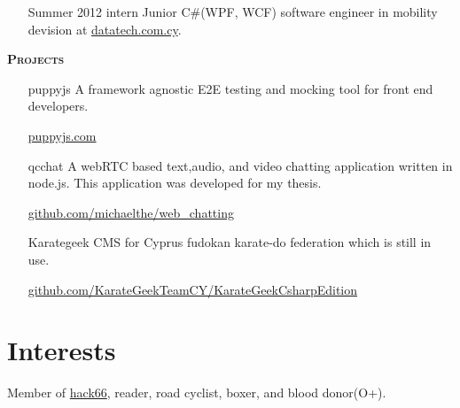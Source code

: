 \documentclass[margin, 10pt]{res} %
\begin{document}
\begin{resume}
\begin{itemize}
            \item[Summer 2012 intern] Junior C\#(WPF, WCF) software engineer in mobility devision at
            \href{http://www.datatech.com.cy/}{datatech.com.cy}. \\

        \end{itemize}

        \textsc{ \textbf{Projects}}

        \begin{itemize}

            \item[puppyjs] A framework agnostic E2E testing and mocking tool for front end developers.

            \href{http://www.puppyjs.com}{puppyjs.com} \\

            \item[qcchat] A webRTC based text,audio, and video chatting application written in node.js.
            This application was developed for my thesis.

            \href{https://github.com/michaelthe/web_chatting}{github.com/michaelthe/web\_chatting} \\

            \item[Karategeek] CMS for Cyprus fudokan karate-do federation which is still in use.

            \href{https://github.com/KarateGeekTeamCY/KarateGeekCsharpEdition/tree/baseV4.5.1}{github.com/KarateGeekTeamCY/KarateGeekCsharpEdition} \\

        \end{itemize}

        \section{Interests}

        Member of \href{http://hack66.info/}{hack66}, reader, road cyclist, boxer, and blood donor(O+).

    \end{resume}
\end{document}
